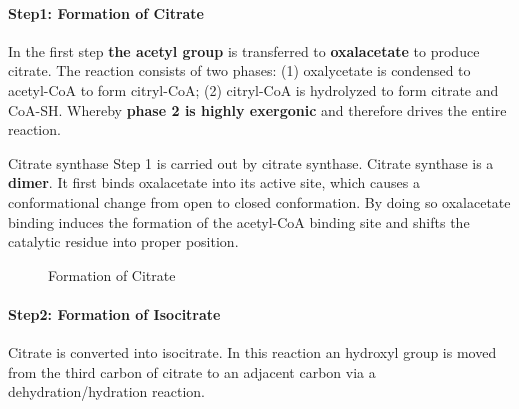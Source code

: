 \documentclass[../main.tex]{subfiles}
\begin{document}
\paragraph{Step1: Formation of Citrate}
In the first step \textbf{the acetyl group} is transferred to \textbf{oxalacetate} to produce citrate. The reaction consists of two phases: (1) oxalycetate is condensed to acetyl-CoA to form citryl-CoA; (2) citryl-CoA is hydrolyzed to form citrate and CoA-SH. Whereby \textbf{phase 2 is highly exergonic} and therefore drives the entire reaction. 

\begin{RemarkWithTitel}{Citrate synthase}
	Step 1 is carried out by citrate synthase. Citrate synthase is a \textbf{dimer}. It first binds oxalacetate into its active site, which causes a conformational change from open to closed conformation. By doing so oxalacetate binding induces the formation of the acetyl-CoA binding site and shifts the catalytic residue into proper position. 
\end{RemarkWithTitel}

\begin{figure}[H]
	\centering
	\caption{Formation of Citrate}
\end{figure}

\paragraph{Step2: Formation of Isocitrate}
Citrate is converted into isocitrate. In this reaction an hydroxyl group is moved from the third carbon of citrate to an adjacent carbon via a dehydration/hydration reaction. 
\end{document}

